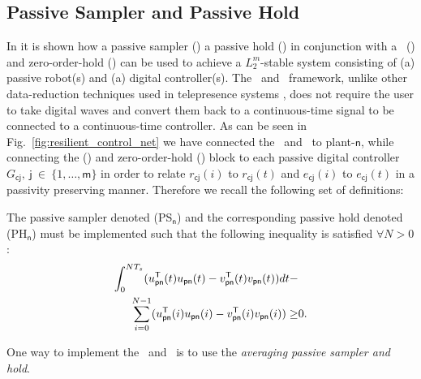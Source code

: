 \subsection{Passive Sampler and Passive Hold}
\label{S:ps_ph}
In \cite{kottenstette08:_passiv_based_desig_of_wirel}
it is shown how a passive sampler (\PS) a passive hold (\PH) in
conjunction with a \ipes\ (\IPES) and zero-order-hold  (\ZOH) can be
used to achieve a $L^m_2$-stable system consisting of (a) passive robot(s)
and (a) digital controller(s).  The \PS\ and \PH\ framework, unlike
other data-reduction techniques used in telepresence systems  \cite{hirche07:_trans_data_reduc_in_networ_ii}, does
not require the user to take digital waves and convert them back to a 
continuous-time signal to be connected to a continuous-time
controller.   As can be seen in Fig.~\ref{fig:resilient_control_net}
we have connected the \PS\ and \PH\ to plant-$\mathsf{n}$, while
connecting the (\IPES)  and zero-order-hold (\ZOH) block to each
passive digital controller $G_{\mathsf{cj}},\ \mathsf{j}\ \in\
\{1,\dots,\mathsf{m}\}$ in order to relate $r_{\mathsf{cj}}(i)$ to
$r_{\mathsf{cj}}(t)$ and $e_{\mathsf{cj}}(i)$ to $e_{\mathsf{cj}}(t)$
in a passivity preserving manner.  Therefore we recall the following
set of definitions:
\begin{definition}
\label{D:ps_ph}
The passive sampler denoted (\textsf{PS}$_{\mathsf{n}}$) and the
corresponding passive hold denoted (\textsf{PH}$_{\mathsf{n}}$) must
be implemented such that the following inequality is satisfied
$\forall N > 0$:
\begin{eqnarray}
\label{E:ps_ph}
\int_0^{NT_s} (u_{\mathsf{pn}}^{\mathsf{T}}(t)u_{\mathsf{pn}} (t) - v_{\mathsf{pn}}^{\mathsf{T}}(t)v_{\mathsf{pn}} (t)) dt -& \nonumber \\
 \sum_{i=0}^{N-1} (u_{\mathsf{pn}}^{\mathsf{T}}(i)u_{\mathsf{pn}} (i) - v_{\mathsf{pn}}^{\mathsf{T}}(i)v_{\mathsf{pn}} (i)) \geq& 0.
\end{eqnarray}
\end{definition}
One way to implement the \PS\ and \PH\ is to use the 
{\em averaging passive sampler and hold}.
